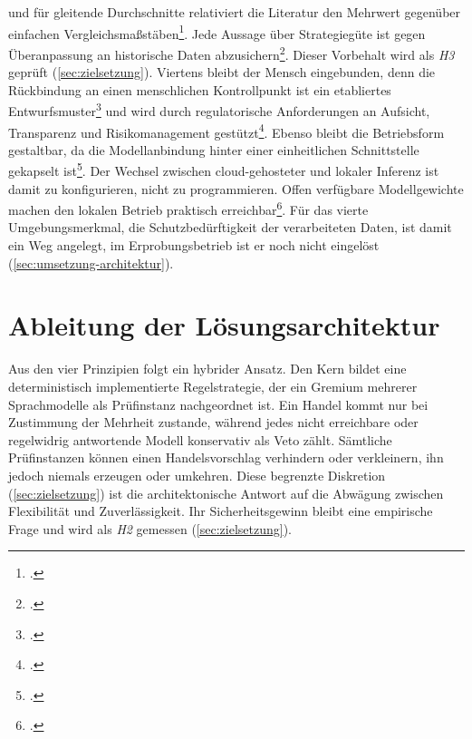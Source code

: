 und für gleitende Durchschnitte relativiert die Literatur den Mehrwert gegenüber
einfachen Vergleichsmaßstäben\footcites[vgl.][S.~69--79]{faber2007}[vgl.][Kap.~1]{zakamulin2017}.
Jede Aussage über Strategiegüte ist gegen Überanpassung an historische Daten
abzusichern\footcites[vgl.][S.~458--471]{bailey2014}[vgl.][S.~39--69]{bailey2017}[vgl.][Kap.~11]{lopezdeprado2018}.
Dieser Vorbehalt wird als \emph{H3} geprüft (\cref{sec:zielsetzung}). Viertens
bleibt der Mensch eingebunden, denn die Rückbindung an einen menschlichen
Kontrollpunkt ist ein etabliertes
Entwurfsmuster\footcite[vgl.][S.~377]{lazarosHitl2026} und wird
durch regulatorische Anforderungen an Aufsicht, Transparenz und Risikomanagement
gestützt\footcites[vgl.][Art.~14]{aiact2024}[vgl.][Kap.~3]{nist2023}[vgl.][]{bafin2021}[vgl.][]{bafin2024}.
Ebenso bleibt die Betriebsform gestaltbar, da die Modellanbindung hinter einer
einheitlichen Schnittstelle gekapselt
ist\footcites[vgl.][]{ollama2026}[vgl.][]{openclawProviders2026}. Der Wechsel
zwischen cloud-gehosteter und lokaler Inferenz ist damit zu konfigurieren, nicht zu
programmieren. Offen verfügbare Modellgewichte machen den lokalen Betrieb praktisch
erreichbar\footcites[vgl.][]{gemma3Report2025}[vgl.][]{qwen25Report2024}[vgl.][]{deepseekV3Report2024}.
Für das vierte Umgebungsmerkmal, die Schutzbedürftigkeit der verarbeiteten Daten, ist damit ein Weg angelegt, im Erprobungsbetrieb ist er noch nicht eingelöst (\cref{sec:umsetzung-architektur}).

\section{Ableitung der Lösungsarchitektur}
\label{sec:grundlagen-ableitung}

Aus den vier Prinzipien folgt ein hybrider Ansatz. Den Kern bildet eine
deterministisch implementierte Regelstrategie, der ein Gremium mehrerer
Sprachmodelle als Prüfinstanz nachgeordnet ist. Ein Handel kommt nur bei
Zustimmung der Mehrheit zustande, während jedes nicht erreichbare oder regelwidrig
antwortende Modell konservativ als Veto zählt. Sämtliche Prüfinstanzen können
einen Handelsvorschlag verhindern oder verkleinern, ihn jedoch niemals erzeugen oder
umkehren. Diese begrenzte Diskretion (\cref{sec:zielsetzung}) ist die architektonische Antwort auf die Abwägung zwischen Flexibilität und Zuverlässigkeit. Ihr Sicherheitsgewinn bleibt eine
empirische Frage und wird als \emph{H2} gemessen (\cref{sec:zielsetzung}).

